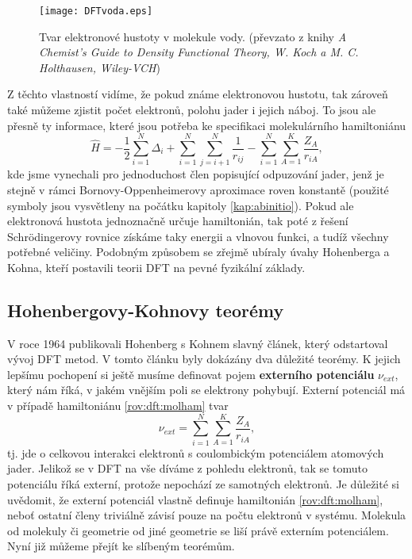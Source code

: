 \begin{figure}
\centering
\texttt{[image: DFTvoda.eps]}
\caption[Elektronová hustota]{Tvar elektronové hustoty v molekule vody. (převzato z knihy \textit{A Chemist’s Guide to
Density Functional Theory, W. Koch a M. C. Holthausen,  Wiley-VCH})}
\label{obr:dftvoda}
\end{figure}

Z těchto vlastností vidíme, že pokud známe elektronovou hustotu, tak zároveň také můžeme zjistit počet elektronů, polohu jader i jejich náboj. To jsou ale přesně ty informace, které jsou potřeba ke specifikaci molekulárního hamiltoniánu
\begin{equation}
\hat{H}= -\frac{1}{2} \sum_{i=1}^N\Delta_i+\sum_{i=1}^N\sum_{j=i+1}^N\frac{1}{r_{ij}}-\sum_{i=1}^N\sum_{A=1}^K \frac{Z_A}{r_{iA}} ,
\label{rov:dft:molham}
\end{equation}
kde jsme vynechali pro jednoduchost člen popisující odpuzování jader, jenž je stejně v rámci Bornovy-Oppenheimerovy aproximace roven konstantě (použité symboly jsou vysvětleny na počátku kapitoly \ref{kap:abinitio}). Pokud ale elektronová hustota jednoznačně určuje hamiltonián, tak poté z řešení Schr\"odingerovy rovnice získáme taky energii a vlnovou funkci, a tudíž všechny potřebné veličiny. Podobným způsobem se zřejmě ubíraly úvahy Hohenberga a Kohna, kteří postavili teorii DFT na pevné fyzikální základy.

\subsection{Hohenbergovy-Kohnovy teorémy}

V roce 1964 publikovali Hohenberg s Kohnem slavný článek, který odstartoval vývoj DFT metod.
V tomto článku byly dokázány dva důležité teorémy. K jejich lepšímu pochopení si ještě musíme definovat pojem \textbf{externího potenciálu} $\nu_{ext}$, který nám říká, v jakém vnějším poli se elektrony pohybují. Externí potenciál má v případě hamiltoniánu \eqref{rov:dft:molham} tvar
\begin{equation}
\nu_{ext}=\sum_{i=1}^N\sum_{A=1}^K \frac{Z_A}{r_{iA}} ,
\end{equation} 
tj. jde o celkovou interakci elektronů s coulombickým potenciálem atomových jader. Jelikož se v DFT na vše díváme z pohledu elektronů, tak se tomuto potenciálu říká externí, protože nepochází ze samotných elektronů.
Je důležité si uvědomit, že externí potenciál vlastně definuje hamiltonián \eqref{rov:dft:molham}, neboť ostatní členy triviálně závisí pouze na počtu elektronů v systému. Molekula od molekuly či geometrie od jiné geometrie se liší právě externím potenciálem. Nyní již můžeme přejít ke slíbeným teorémům.

